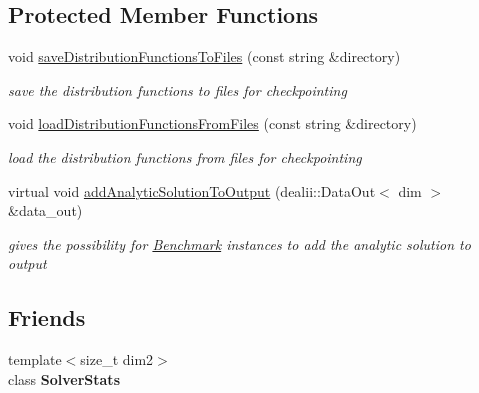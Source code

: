 \subsection*{Protected Member Functions}
\begin{DoxyCompactItemize}
\item 
\hypertarget{classnatrium_1_1CFDSolver_a9a2592ea549fa10427c84f0a1e380c1e}{void \hyperlink{classnatrium_1_1CFDSolver_a9a2592ea549fa10427c84f0a1e380c1e}{save\-Distribution\-Functions\-To\-Files} (const string \&directory)}\label{classnatrium_1_1CFDSolver_a9a2592ea549fa10427c84f0a1e380c1e}

\begin{DoxyCompactList}\small\item\em save the distribution functions to files for checkpointing \end{DoxyCompactList}\item 
\hypertarget{classnatrium_1_1CFDSolver_a42245d22e289d079a3b06a0c26f50050}{void \hyperlink{classnatrium_1_1CFDSolver_a42245d22e289d079a3b06a0c26f50050}{load\-Distribution\-Functions\-From\-Files} (const string \&directory)}\label{classnatrium_1_1CFDSolver_a42245d22e289d079a3b06a0c26f50050}

\begin{DoxyCompactList}\small\item\em load the distribution functions from files for checkpointing \end{DoxyCompactList}\item 
\hypertarget{classnatrium_1_1CFDSolver_a2b0be7ae225b1d3ab4aa5a641ae52497}{virtual void \hyperlink{classnatrium_1_1CFDSolver_a2b0be7ae225b1d3ab4aa5a641ae52497}{add\-Analytic\-Solution\-To\-Output} (dealii\-::\-Data\-Out$<$ dim $>$ \&data\-\_\-out)}\label{classnatrium_1_1CFDSolver_a2b0be7ae225b1d3ab4aa5a641ae52497}

\begin{DoxyCompactList}\small\item\em gives the possibility for \hyperlink{classnatrium_1_1Benchmark}{Benchmark} instances to add the analytic solution to output \end{DoxyCompactList}\end{DoxyCompactItemize}
\subsection*{Friends}
\begin{DoxyCompactItemize}
\item 
\hypertarget{classnatrium_1_1CFDSolver_ae7379bc2c8ff4554d9a0567dece3c38e}{{\footnotesize template$<$size\-\_\-t dim2$>$ }\\class {\bfseries Solver\-Stats}}\label{classnatrium_1_1CFDSolver_ae7379bc2c8ff4554d9a0567dece3c38e}

\end{DoxyCompactItemize}


